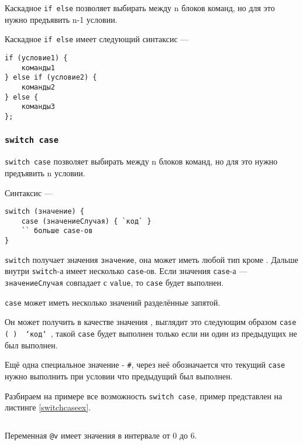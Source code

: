 Каскадное \texttt{if else} позволяет выбирать между n блоков команд, но для это нужно предъявить n-1 условии.

Каскадное \texttt{if else} имеет следующий синтаксис —
\begin{verbatim}
if (условие1) {
	команды1
} else if (условие2) {
	команды2
} else {
	команды3
};
\end{verbatim}

\subsubsection{\texttt{switch case}}

\texttt{switch case} позволяет выбирать между n блоков команд, но для это нужно предъявить n условии.

Синтаксис —
\begin{verbatim}
switch (значение) {
	case (значениеСлучая) { `код` }
	`` больше case-ов
}
\end{verbatim}

\texttt{switch} получает значения \texttt{значение}, она может иметь любой тип кроме \bool. Дальше внутри \texttt{switch}-а имеет несколько \texttt{case}-ов. Если значения \texttt{case}-а — \texttt{значениеСлучая} совпадает с \texttt{value}, то \texttt{case} будет выполнен.

\texttt{case} может иметь несколько значений разделённые запятой.

Он может получить в качестве значения \void, выглядит это следующим образом \texttt{case (~) { `код` }}, такой \texttt{case} будет выполнен только если ни один из предыдущих не был выполнен.

Ещё одна специальное значение - \texttt{#}, через неё обозначается что текущий \texttt{case} нужно выполнить при условии что предыдущий был выполнен.

Разбираем на примере все возможность \texttt{switch case}, пример представлен на листинге \ref{switchcaseex}.

\begin{sourcecode}
	\label{switchcaseex}
    \inputminted[linenos]{icl}{../sources/switchcaseex.icL}
\end{sourcecode}

Переменная \texttt{@v} имеет значения в интервале от 0 до 6.

